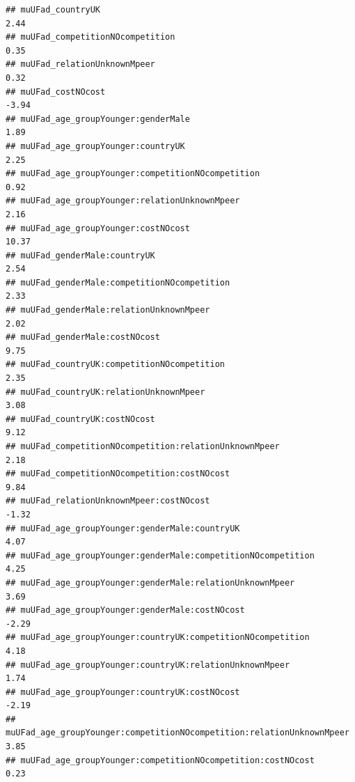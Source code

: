 \documentclass[
]{article}
\begin{document}
\begin{verbatim}
## muUFad_countryUK                                                                      2.44
## muUFad_competitionNOcompetition                                                       0.35
## muUFad_relationUnknownMpeer                                                           0.32
## muUFad_costNOcost                                                                    -3.94
## muUFad_age_groupYounger:genderMale                                                    1.89
## muUFad_age_groupYounger:countryUK                                                     2.25
## muUFad_age_groupYounger:competitionNOcompetition                                      0.92
## muUFad_age_groupYounger:relationUnknownMpeer                                          2.16
## muUFad_age_groupYounger:costNOcost                                                   10.37
## muUFad_genderMale:countryUK                                                           2.54
## muUFad_genderMale:competitionNOcompetition                                            2.33
## muUFad_genderMale:relationUnknownMpeer                                                2.02
## muUFad_genderMale:costNOcost                                                          9.75
## muUFad_countryUK:competitionNOcompetition                                             2.35
## muUFad_countryUK:relationUnknownMpeer                                                 3.08
## muUFad_countryUK:costNOcost                                                           9.12
## muUFad_competitionNOcompetition:relationUnknownMpeer                                  2.18
## muUFad_competitionNOcompetition:costNOcost                                            9.84
## muUFad_relationUnknownMpeer:costNOcost                                               -1.32
## muUFad_age_groupYounger:genderMale:countryUK                                          4.07
## muUFad_age_groupYounger:genderMale:competitionNOcompetition                           4.25
## muUFad_age_groupYounger:genderMale:relationUnknownMpeer                               3.69
## muUFad_age_groupYounger:genderMale:costNOcost                                        -2.29
## muUFad_age_groupYounger:countryUK:competitionNOcompetition                            4.18
## muUFad_age_groupYounger:countryUK:relationUnknownMpeer                                1.74
## muUFad_age_groupYounger:countryUK:costNOcost                                         -2.19
## muUFad_age_groupYounger:competitionNOcompetition:relationUnknownMpeer                 3.85
## muUFad_age_groupYounger:competitionNOcompetition:costNOcost                           0.23

\end{verbatim}
\end{document}
